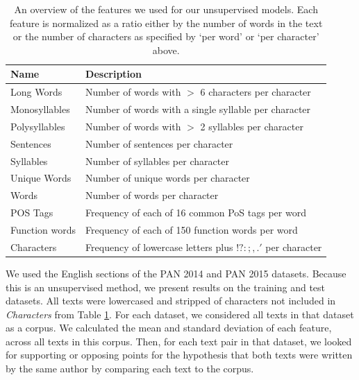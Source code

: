 \begin{table}[ht]
\caption{\label{tab:unsupfeatures} An overview of the features we used for our unsupervised models. Each feature is normalized as a ratio either by the number of words in the text or the number of characters as specified by `per word' or `per character' above.}
\begin{center}
\begin{tabular}{ll}
\toprule
\bf Name & \bf Description \\
\midrule
Long Words & Number of words with $>$ 6 characters per character      \\
Monosyllables & Number of words with a single syllable per character  \\
Polysyllables & Number of words with $>$ 2 syllables per character    \\
Sentences & Number of sentences per character                     \\
Syllables & Number of syllables per character                     \\
Unique Words & Number of unique words per character               \\
Words & Number of words per character                              \\
POS Tags & Frequency of each of 16 common PoS tags per word             \\
Function words & Frequency of each of 150 function words per word       \\ 
Characters & Frequency of lowercase letters plus $!?:;,.'$ per character \\
\bottomrule
\end{tabular}
\end{center}
\end{table}

We used the English sections of the PAN 2014 and PAN 2015 datasets. Because this is an unsupervised method, we present results on the training and test datasets. 
All texts were lowercased and stripped of characters not included in \textit{Characters} from Table \ref{tab:unsupfeatures}. For each dataset, we considered all texts in that dataset as a corpus. We calculated the mean and standard deviation of each feature, across all texts in this corpus. Then, for each text pair in that dataset, we looked for supporting or opposing points for the hypothesis that both texts were written by the same author by comparing each text to the corpus.

